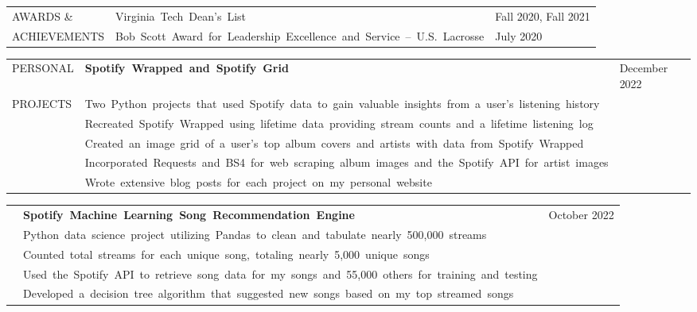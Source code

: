 \documentclass[12pt, letter]{book}
\begin{document}

\vspace{3mm}

\noindent
\begin{tabular}{@{}>{\raggedright\arraybackslash}p{3.5cm}@{}p{5cm}@{}>{\raggedleft\arraybackslash}p{10.5cm}@{}}
    \footnotesize {AWARDS \& } & {\footnotesize\mbox{Virginia Tech Dean’s List}} & \footnotesize {Fall 2020, Fall 2021} \\
    \footnotesize {ACHIEVEMENTS} & {\footnotesize\mbox{Bob Scott Award for Leadership Excellence and Service – U.S. Lacrosse}} & \footnotesize {July 2020} \\
\end{tabular}

\vspace{3mm}



\noindent
\begin{tabular}{@{}>{\raggedright\arraybackslash}p{3.5cm}@{}p{5cm}@{}>{\raggedleft\arraybackslash}p{10.5cm}@{}}
    \footnotesize {PERSONAL} & \textbf{\footnotesize\mbox{Spotify Wrapped and Spotify Grid}} & \footnotesize {December 2022} \\
    \footnotesize {PROJECTS} & {\footnotesize\mbox{Two Python projects that used Spotify data to gain valuable insights from a user's listening history}} \\
    & {\footnotesize\mbox{Recreated Spotify Wrapped using lifetime data providing stream counts and a lifetime listening log}} \\
    & {\footnotesize\mbox{Created an image grid of a user's top album covers and artists with data from Spotify Wrapped}} \\
    & {\footnotesize\mbox{Incorporated Requests and BS4 for web scraping album images and the Spotify API for artist images}} \\
    & {\footnotesize\mbox{Wrote extensive blog posts for each project on my personal website}} \\
\end{tabular}

\vspace{2mm}
    
\noindent
\begin{tabular}{@{}>{\raggedright\arraybackslash}p{3.5cm}@{}p{5cm}@{}>{\raggedleft\arraybackslash}p{10.5cm}@{}}
    & \textbf{\footnotesize\mbox{Spotify Machine Learning Song Recommendation Engine}} & \footnotesize {October 2022} \\
    & {\footnotesize\mbox{Python data science project utilizing Pandas to clean and tabulate nearly 500,000 streams}} \\
    & {\footnotesize\mbox{Counted total streams for each unique song, totaling nearly 5,000 unique songs}} \\
    & {\footnotesize\mbox{Used the Spotify API to retrieve song data for my songs and 55,000 others for training and testing}} \\
    & {\footnotesize\mbox{Developed a decision tree algorithm that suggested new songs based on my top streamed songs}}
\end{tabular}
\end{document}
